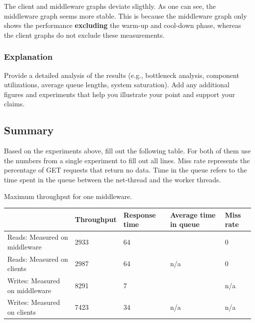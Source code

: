 \documentclass[11pt,a4paper]{article}
\begin{document}
The client and middleware graphs deviate sligthly.
As one can see, the middleware graph seems more stable.
This is because the middleware graph only shows the performance \textbf{excluding} the warm-up and cool-down phase, whereas the client graphs do not exclude these measurements.

\subsubsection{Explanation}

Provide a detailed analysis of the results (e.g., bottleneck analysis, component utilizations, average queue lengths, system saturation). Add any additional figures and experiments that help you illustrate your point and support your claims.

\subsection{Summary}

Based on the experiments above, fill out the following table. For both of them use the numbers from a single experiment to fill out all lines. Miss rate represents the percentage of GET requests that return no data. Time in the queue refers to the time spent in the queue between the net-thread and the worker threads.


\begin{center}
	{Maximum throughput for one middleware.}
	\begin{tabular}{|l|p{2cm}|p{2cm}|p{2cm}|p{2cm}|}
		\hline                                & Throughput & Response time & Average time in queue & Miss rate \\ 
		\hline Reads: Measured on middleware  & 2933 & 64 &                       &           0 \\ 
		\hline Reads: Measured on clients     & 2987 & 64 & n/a                   &           0 \\ 
		\hline Writes: Measured on middleware & 8291 & 7 &                       & n/a       \\ 
		\hline Writes: Measured on clients    & 7423 & 34 & n/a                   & n/a       \\ 
		\hline 
	\end{tabular}
\end{center}
\end{document}
